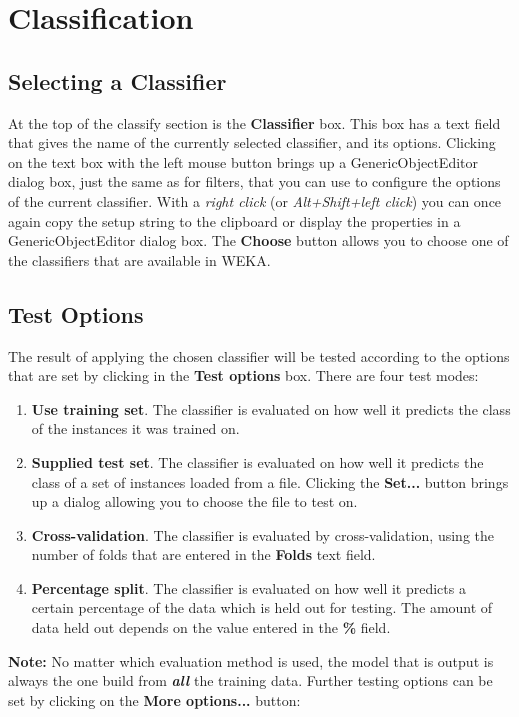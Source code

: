\newpage

\section{Classification}

\begin{center}
\end{center}

\subsection{Selecting a Classifier}

\label{sec:classifier}
At the top of the classify section is the \textbf{Classifier}
box. This box has a text field that gives the name of the currently
selected classifier, and its options. Clicking on the text box with 
the left mouse button brings up a GenericObjectEditor dialog box, 
just the same as for filters, that you can use to configure the options 
of the current classifier. With a \textit{right click} (or 
\textit{Alt+Shift+left click}) you can once again copy 
the setup string to the clipboard or display the properties in a 
GenericObjectEditor dialog box.
The \textbf{Choose} button allows you to choose one of the classifiers
that are available in WEKA.

\subsection{Test Options}

The result of applying the chosen classifier will be tested according to the
options that are set by clicking in the \textbf{Test options} box.  There are
four test modes:

\begin{enumerate}
\item \textbf{Use training set}.
The classifier is evaluated on how well it predicts the class of the instances
it was trained on. 
\item \textbf{Supplied test set}.
The classifier is evaluated on how well it predicts the class of a set of
instances loaded from a file. Clicking the \textbf{Set...} button brings up a
dialog allowing you to choose the file to test on.
\item \textbf{Cross-validation}.
The classifier is evaluated by cross-validation, using the number of folds that
are entered in the \textbf{Folds} text field. 
\item \textbf{Percentage split}.
The classifier is evaluated on how well it predicts a certain percentage of the
data which is held out for testing. The amount of data held out depends on the
value entered in the \textbf{\%} field.
\end{enumerate}
\noindent
\textbf{Note:} No matter which evaluation method is used, the model
that is output is always the one build from \textbf{\em all} the training data.
\noindent
Further testing options can be set by clicking on the \textbf{More options...}
button:

